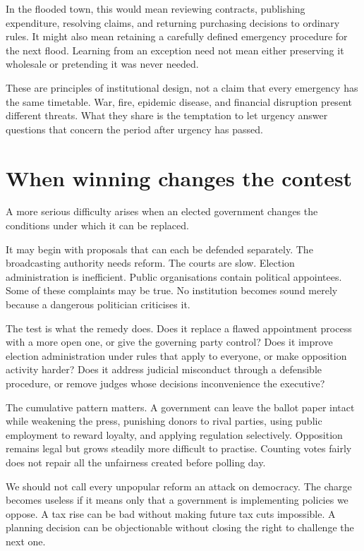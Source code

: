 \documentclass[12pt,a4paper]{book}
\begin{document}
In the flooded town, this would mean reviewing contracts, publishing expenditure, resolving claims, and returning purchasing decisions to ordinary rules. It might also mean retaining a carefully defined emergency procedure for the next flood. Learning from an exception need not mean either preserving it wholesale or pretending it was never needed.

These are principles of institutional design, not a claim that every emergency has the same timetable. War, fire, epidemic disease, and financial disruption present different threats. What they share is the temptation to let urgency answer questions that concern the period after urgency has passed.

\section*{When winning changes the contest}

A more serious difficulty arises when an elected government changes the conditions under which it can be replaced.

It may begin with proposals that can each be defended separately. The broadcasting authority needs reform. The courts are slow. Election administration is inefficient. Public organisations contain political appointees. Some of these complaints may be true. No institution becomes sound merely because a dangerous politician criticises it.

The test is what the remedy does. Does it replace a flawed appointment process with a more open one, or give the governing party control? Does it improve election administration under rules that apply to everyone, or make opposition activity harder? Does it address judicial misconduct through a defensible procedure, or remove judges whose decisions inconvenience the executive?

The cumulative pattern matters. A government can leave the ballot paper intact while weakening the press, punishing donors to rival parties, using public employment to reward loyalty, and applying regulation selectively. Opposition remains legal but grows steadily more difficult to practise. Counting votes fairly does not repair all the unfairness created before polling day.

We should not call every unpopular reform an attack on democracy. The charge becomes useless if it means only that a government is implementing policies we oppose. A tax rise can be bad without making future tax cuts impossible. A planning decision can be objectionable without closing the right to challenge the next one.
\end{document}
